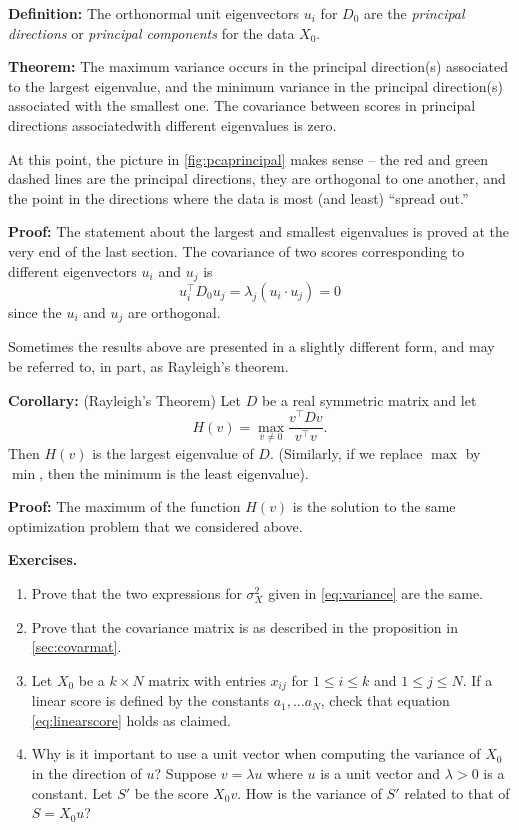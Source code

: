 \documentclass[
  oneside]{scrbook}
\begin{document}
\textbf{Definition:} The orthonormal unit eigenvectors \(u_{i}\) for
\(D_{0}\) are the \emph{principal directions} or \emph{principal
components} for the data \(X_{0}\).

\textbf{Theorem:} The maximum variance occurs in the principal
direction(s) associated to the largest eigenvalue, and the minimum
variance in the principal direction(s) associated with the smallest one.
The covariance between scores in principal directions associatedwith
different eigenvalues is zero.

At this point, the picture in \cref{fig:pcaprincipal} makes sense -- the
red and green dashed lines are the principal directions, they are
orthogonal to one another, and the point in the directions where the
data is most (and least) ``spread out.''

\textbf{Proof:} The statement about the largest and smallest eigenvalues
is proved at the very end of the last section. The covariance of two
scores corresponding to different eigenvectors \(u_{i}\) and \(u_{j}\)
is \[u_{i}^{\intercal}D_{0}u_{j} = \lambda_{j}(u_{i}\cdot u_{j}) = 0\]
since the \(u_{i}\) and \(u_{j}\) are orthogonal.

Sometimes the results above are presented in a slightly different form,
and may be referred to, in part, as Rayleigh's theorem.

\textbf{Corollary:} (Rayleigh's Theorem) Let \(D\) be a real symmetric
matrix and let \[
H(v) = \max_{v\not = 0}\frac{v^{\intercal}Dv}{v^{\intercal}v}.
\] Then \(H(v)\) is the largest eigenvalue of \(D\). (Similarly, if we
replace \(\max\) by \(\min\), then the minimum is the least eigenvalue).

\textbf{Proof:} The maximum of the function \(H(v)\) is the solution to
the same optimization problem that we considered above.

\textbf{Exercises.}

\begin{enumerate}
\def\labelenumi{\arabic{enumi}.}
\item
  Prove that the two expressions for \(\sigma_{X}^2\) given in
  \cref{eq:variance} are the same.
\item
  Prove that the covariance matrix is as described in the proposition in
  \ref{sec:covarmat}.
\item
  Let \(X_{0}\) be a \(k\times N\) matrix with entries \(x_{ij}\) for
  \(1\le i\le k\) and \(1\le j\le N\). If a linear score is defined by
  the constants \(a_{1},\ldots a_{N}\), check that equation
  \cref{eq:linearscore} holds as claimed.
\item
  Why is it important to use a unit vector when computing the variance
  of \(X_{0}\) in the direction of \(u\)? Suppose \(v=\lambda u\) where
  \(u\) is a unit vector and \(\lambda>0\) is a constant. Let \(S'\) be
  the score \(X_{0}v\). How is the variance of \(S'\) related to that of
  \(S=X_{0}u\)?
\end{enumerate}
\end{document}
